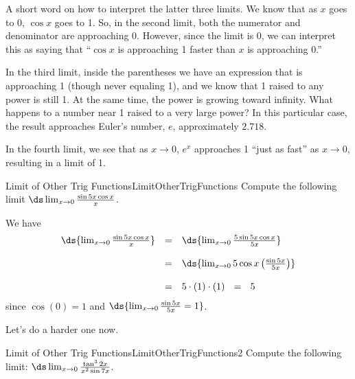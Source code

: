 A short word on how to interpret the latter three limits. We know that as $x$ goes to 0, $\cos x$ goes to 1. So, in the second limit, both the numerator and denominator are approaching 0. However, since the limit is 0, we can interpret this as saying that ``$\cos x$ is approaching 1 faster than $x$ is approaching 0.''

In the third limit, inside the parentheses we have an expression that is approaching 1 (though never equaling 1), and we know that 1 raised to any power is still 1. At the same time, the power is growing toward infinity. What happens to a number near 1 raised to a very large power? In this particular case, the result approaches Euler's number, $e$, approximately $2.718.$

In the fourth limit, we see that as $x\to 0$, $e^x$ approaches 1 ``just as fast'' as $x\to 0$, resulting in a limit of 1.\\


\begin{example}{Limit of Other Trig Functions}{LimitOtherTrigFunctions}
Compute the following limit $\ds\lim_{x\to 0}\frac{\sin 5x\cos x}{x}$.
\end{example}

\begin{solution} 
We have
$$\begin{array}{rcl}
\ds{\lim_{x\to 0}\frac{\sin 5x\cos x}{x}} & = & \ds{\lim_{x\to 0}\frac{5\sin 5x\cos x}{5x}}\\
\\
~ & = & \ds{\lim_{x\to 0} 5\cos x\left(\frac{\sin 5x}{5x}\right)}\\
\\
~ & = &  5\cdot (1)\cdot (1)~~=~~5\\
\end{array}$$
since $\cos(0)=1$ and $\ds{\lim_{x\to 0}\frac{\sin 5x}{5x}=1}$.
\end{solution}
Let's do a harder one now.

\begin{example}{Limit of Other Trig Functions}{LimitOtherTrigFunctions2}
Compute the following limit:
$\ds\lim_{x\to 0}\frac{\tan^3 2x}{x^2\sin 7x}$.
\end{example}


